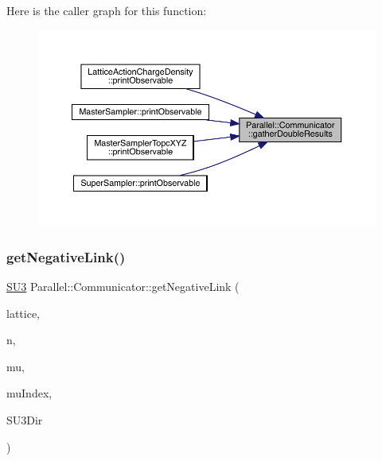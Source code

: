 Here is the caller graph for this function\+:\nopagebreak
\begin{figure}[H]
\begin{center}
\leavevmode
\includegraphics[width=350pt]{class_parallel_1_1_communicator_a6c60f0fbbe23ef0bf342b0157d080007_icgraph}
\end{center}
\end{figure}
\mbox{\label{class_parallel_1_1_communicator_ad3b8781686b517c146d9d2f2dbf932de}} 
\subsubsection{\texorpdfstring{getNegativeLink()}{getNegativeLink()}}
{\footnotesize\ttfamily \mbox{\hyperlink{class_s_u3}{S\+U3}} Parallel\+::\+Communicator\+::get\+Negative\+Link (\begin{DoxyParamCaption}\item[{\mbox{\hyperlink{class_lattice}{Lattice}}$<$ \mbox{\hyperlink{class_s_u3}{S\+U3}} $>$ $\ast$}]{lattice,  }\item[{std\+::vector$<$ int $>$}]{n,  }\item[{int}]{mu,  }\item[{int $\ast$}]{mu\+Index,  }\item[{int}]{S\+U3\+Dir }\end{DoxyParamCaption})\hspace{0.3cm}{\ttfamily [static]}}

